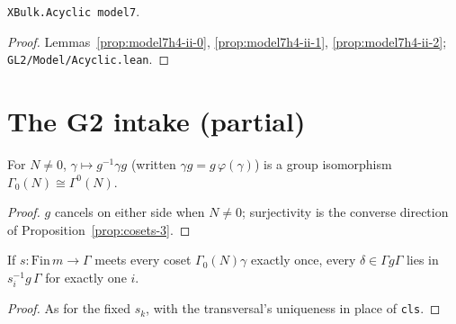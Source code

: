 \begin{proposition}\label{prop:model7h4-ii}
  \leanok
  \texttt{XBulk.Acyclic model7}.
\end{proposition}
\begin{proof}
  \leanok
  Lemmas~\ref{prop:model7h4-ii-0}, \ref{prop:model7h4-ii-1}, \ref{prop:model7h4-ii-2}; \texttt{GL2/Model/Acyclic.lean}.
\end{proof}

\section{The G2 intake (partial)}

\begin{proposition}\label{prop:cosets-3-iso}
  \leanok
  For $N\ne0$, $\gamma\mapsto g^{-1}\gamma g$ (written $\gamma g=g\,\varphi(\gamma)$) is a group isomorphism
  $\Gamma_0(N)\cong\Gamma^0(N)$.
\end{proposition}
\begin{proof}
  \leanok
  $g$ cancels on either side when $N\ne0$; surjectivity is the converse direction of Proposition~\ref{prop:cosets-3}.
\end{proof}

\begin{theorem}\label{prop:cosets-5-any}
  \leanok
  If $s:\mathrm{Fin}\,m\to\Gamma$ meets every coset $\Gamma_0(N)\gamma$ exactly once, every $\delta\in\Gamma g\Gamma$ lies in
  $s_i^{-1}g\,\Gamma$ for exactly one $i$.
\end{theorem}
\begin{proof}
  \leanok
  As for the fixed $s_k$, with the transversal's uniqueness in place of \texttt{cls}.
\end{proof}

